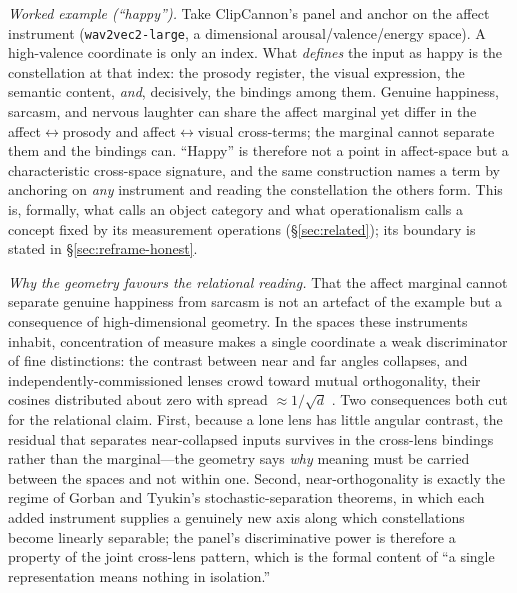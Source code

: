 \documentclass[10pt,twocolumn]{article}
\begin{document}
\emph{Worked example (``happy'').} Take ClipCannon's panel and anchor on the
affect instrument (\texttt{wav2vec2-large}, a dimensional arousal/valence/energy
space). A high-valence coordinate is only an index. What \emph{defines} the input
as happy is the constellation at that index: the prosody register, the visual
expression, the semantic content, \emph{and}, decisively, the bindings among
them. Genuine happiness, sarcasm, and nervous laughter can share the affect
marginal yet differ in the affect$\leftrightarrow$prosody and
affect$\leftrightarrow$visual cross-terms; the marginal cannot separate them and
the bindings can. ``Happy'' is therefore not a point in affect-space but a
characteristic cross-space signature, and the same construction names a term by
anchoring on \emph{any} instrument and reading the constellation the others form.
This is, formally, what \citet{gardenfors2000conceptual} calls an object category
and what operationalism \citep{bridgman1927logic} calls a concept fixed by its
measurement operations (\S\ref{sec:related}); its boundary is stated in
\S\ref{sec:reframe-honest}.

\emph{Why the geometry favours the relational reading.} That the affect marginal
cannot separate genuine happiness from sarcasm is not an artefact of the example
but a consequence of high-dimensional geometry. In the spaces these instruments
inhabit, concentration of measure makes a single coordinate a weak discriminator
of fine distinctions: the contrast between near and far angles collapses, and
independently-commissioned lenses crowd toward mutual orthogonality, their cosines
distributed about zero with spread ${\approx}1/\sqrt{d}$
\citep{vershynin2018hdp,gorban2018blessing}. Two consequences both cut for the
relational claim. First, because a lone lens has little angular contrast, the
residual that separates near-collapsed inputs survives in the cross-lens bindings
rather than the marginal---the geometry says \emph{why} meaning must be carried
between the spaces and not within one. Second, near-orthogonality is exactly the
regime of Gorban and Tyukin's stochastic-separation theorems, in which each added
instrument supplies a genuinely new axis along which constellations become
linearly separable; the panel's discriminative power is therefore a property of
the joint cross-lens pattern, which is the formal content of ``a single
representation means nothing in isolation.''
\end{document}
